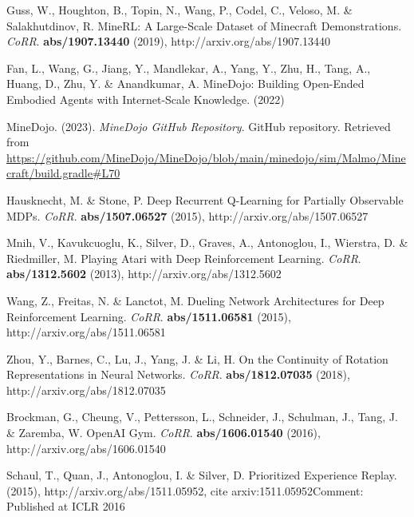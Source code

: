 \documentclass[oneside, under, ko]{snuthesis}
\begin{document}
%

\begin{thebibliography}{00}

    Guss, W., Houghton, B., Topin, N., Wang, P., Codel, C., Veloso, M. \& Salakhutdinov, R. MineRL: A Large-Scale Dataset of Minecraft Demonstrations. {\em CoRR}. \textbf{abs/1907.13440} (2019), http://arxiv.org/abs/1907.13440

    Fan, L., Wang, G., Jiang, Y., Mandlekar, A., Yang, Y., Zhu, H., Tang, A., Huang, D., Zhu, Y. \& Anandkumar, A. MineDojo: Building Open-Ended Embodied Agents with Internet-Scale Knowledge.  (2022)

    MineDojo. (2023). \textit{MineDojo GitHub Repository}. GitHub repository. Retrieved from \url{https://github.com/MineDojo/MineDojo/blob/main/minedojo/sim/Malmo/Minecraft/build.gradle#L70}

    Hausknecht, M. \& Stone, P. Deep Recurrent Q-Learning for Partially Observable MDPs. {\em CoRR}. \textbf{abs/1507.06527} (2015), http://arxiv.org/abs/1507.06527

    Mnih, V., Kavukcuoglu, K., Silver, D., Graves, A., Antonoglou, I., Wierstra, D. \& Riedmiller, M. Playing Atari with Deep Reinforcement Learning. {\em CoRR}. \textbf{abs/1312.5602} (2013), http://arxiv.org/abs/1312.5602

    Wang, Z., Freitas, N. \& Lanctot, M. Dueling Network Architectures for Deep Reinforcement Learning. {\em CoRR}. \textbf{abs/1511.06581} (2015), http://arxiv.org/abs/1511.06581

    Zhou, Y., Barnes, C., Lu, J., Yang, J. \& Li, H. On the Continuity of Rotation Representations in Neural Networks. {\em CoRR}. \textbf{abs/1812.07035} (2018), http://arxiv.org/abs/1812.07035

    Brockman, G., Cheung, V., Pettersson, L., Schneider, J., Schulman, J., Tang, J. \& Zaremba, W. OpenAI Gym. {\em CoRR}. \textbf{abs/1606.01540} (2016), http://arxiv.org/abs/1606.01540

    Schaul, T., Quan, J., Antonoglou, I. \& Silver, D. Prioritized Experience Replay.  (2015), http://arxiv.org/abs/1511.05952, cite arxiv:1511.05952Comment: Published at ICLR 2016


\end{thebibliography}
\end{document}
